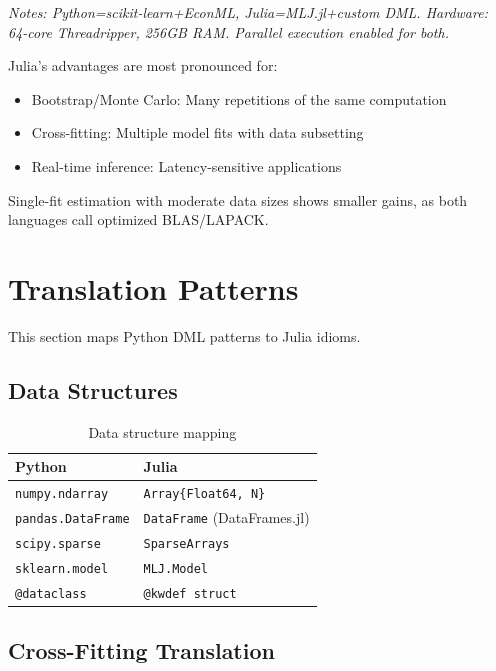 \textit{Notes: Python=scikit-learn+EconML, Julia=MLJ.jl+custom DML. Hardware: 64-core Threadripper, 256GB RAM. Parallel execution enabled for both.}

\begin{keyinsight}
Julia's advantages are most pronounced for:
\begin{itemize}
    \item Bootstrap/Monte Carlo: Many repetitions of the same computation
    \item Cross-fitting: Multiple model fits with data subsetting
    \item Real-time inference: Latency-sensitive applications
\end{itemize}
Single-fit estimation with moderate data sizes shows smaller gains, as both languages call optimized BLAS/LAPACK.
\end{keyinsight}


\section{Translation Patterns}\label{sec:translation_patterns}

This section maps Python DML patterns to Julia idioms.

\subsection{Data Structures}

\begin{table}[htbp]
\centering
\caption{Data structure mapping}
\label{tab:data_structures}
\begin{tabular}{ll}
\toprule
\textbf{Python} & \textbf{Julia} \\
\midrule
\texttt{numpy.ndarray} & \texttt{Array\{Float64, N\}} \\
\texttt{pandas.DataFrame} & \texttt{DataFrame} (DataFrames.jl) \\
\texttt{scipy.sparse} & \texttt{SparseArrays} \\
\texttt{sklearn.model} & \texttt{MLJ.Model} \\
\texttt{@dataclass} & \texttt{@kwdef struct} \\
\bottomrule
\end{tabular}
\end{table}

\subsection{Cross-Fitting Translation}

